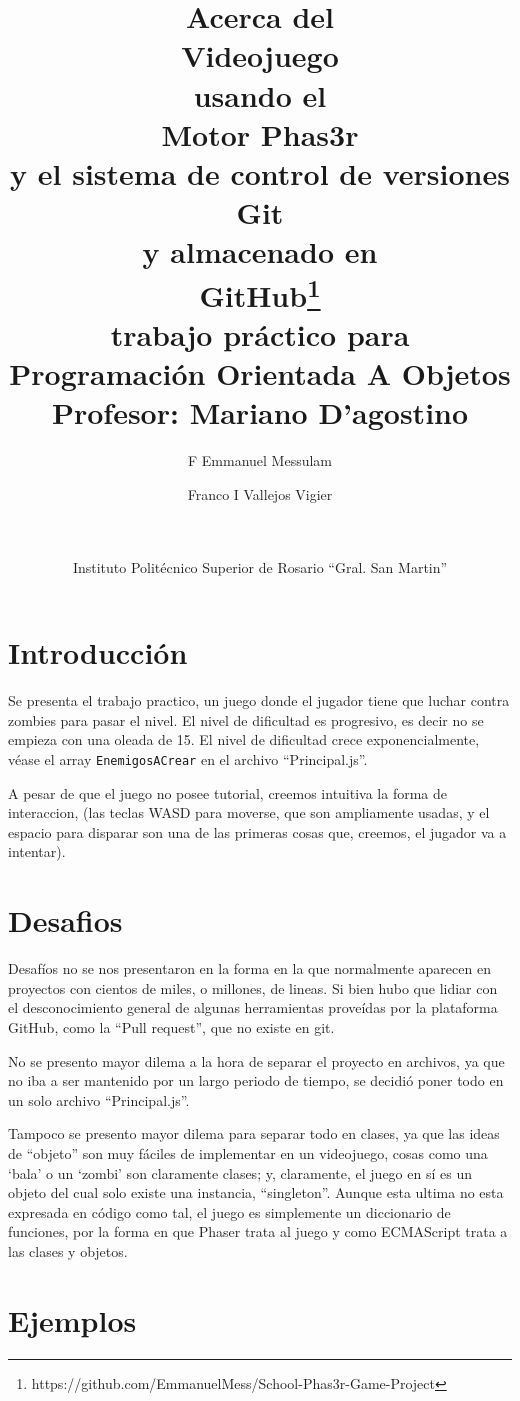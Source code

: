 \documentclass{article}
\title{\textbf{{\small Acerca del}\\
		Videojuego\\
		{\small usando el}\\
		Motor Phas3r\\
		{\small y el sistema de control de versiones}\\
		Git\\
		{\small y almacenado en}\\
		GitHub\footnote{https://github.com/EmmanuelMess/School-Phas3r-Game-Project}\\
		{\small trabajo práctico para}\\
		Programación Orientada A Objetos}\\
	Profesor: Mariano D'agostino}
\author{F Emmanuel Messulam\\
    \and Franco I Vallejos  Vigier\\
    \and \\\\
    Instituto Politécnico Superior de Rosario ``Gral. San Martin''}
\date{}
\begin{document}
    \begin{titlepage}
        \maketitle
        \thispagestyle{empty}
    \end{titlepage}
	\section*{Introducción}   
	Se presenta el trabajo practico, un juego donde el jugador tiene que luchar contra zombies para pasar el nivel. El nivel de dificultad es progresivo, es decir no se empieza con una oleada de 15. El nivel de dificultad crece exponencialmente, véase el array \verb|EnemigosACrear| en el archivo ``Principal.js''.
	
	A pesar de que el juego no posee tutorial, creemos intuitiva la forma de interaccion, (las teclas WASD para moverse, que son ampliamente usadas, y el espacio para disparar son una de las primeras cosas que, creemos, el jugador va a intentar).
	
	\section*{Desafios}
	Desafíos no se nos presentaron en la forma en la que normalmente  aparecen en proyectos con cientos de miles, o millones, de lineas. Si bien hubo que lidiar con el desconocimiento general de algunas herramientas proveídas por la plataforma GitHub, como la ``Pull request'', que no existe en git. 
	
	No se presento mayor dilema a la hora de separar el proyecto en archivos, ya que no iba a ser mantenido por un largo periodo de tiempo, se decidió poner todo en un solo archivo ``Principal.js''.
	
	Tampoco se presento mayor dilema para separar todo en clases, ya que las ideas de ``objeto'' son muy fáciles de implementar en un videojuego, cosas como una `bala' o un `zombi' son claramente clases; y, claramente, el juego en sí es un objeto del cual solo existe una instancia, ``singleton''. Aunque esta ultima no esta expresada en código como tal, el juego es simplemente un diccionario de funciones, por la forma en que Phaser trata al juego y como ECMAScript trata a las clases y objetos.

   	\section*{Ejemplos}
   	
\end{document}
